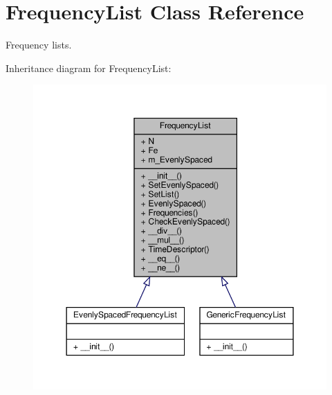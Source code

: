 \hypertarget{classSignalIntegrity_1_1FrequencyDomain_1_1FrequencyList_1_1FrequencyList}{}\section{Frequency\+List Class Reference}
\label{classSignalIntegrity_1_1FrequencyDomain_1_1FrequencyList_1_1FrequencyList}


Frequency lists.  




Inheritance diagram for Frequency\+List\+:
\nopagebreak
\begin{figure}[H]
\begin{center}
\leavevmode
\includegraphics[width=350pt]{classSignalIntegrity_1_1FrequencyDomain_1_1FrequencyList_1_1FrequencyList__inherit__graph}
\end{center}
\end{figure}


